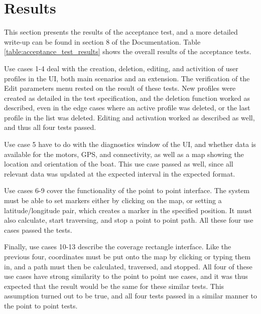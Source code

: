 \newpage
\chapter{Results}
This section presents the results of the acceptance test, and a more detailed write-up can be found in section 8 of the Documentation. Table \ref{table:acceptance_test_results} shows the overall results of the acceptance tests.

Use cases 1-4 deal with the creation, deletion, editing, and activition of user profiles in the UI, both main scenarios and an extension. The verification of the Edit parameters menu rested on the result of these tests. New profiles were created as detailed in the test specification, and the deletion function worked as described, even in the edge cases where an active profile was deleted, or the last profile in the list was deleted. Editing and activation worked as described as well, and thus all four tests passed. 

Use case 5 have to do with the diagnostics window of the UI, and whether data is available for the motors, GPS, and connectivity, as well as a map showing the location and orientation of the boat. This use case passed as well, since all relevant data was updated at the expected interval in the expected format.

Use cases 6-9 cover the functionality of the point to point interface. The system must be able to set markers either by clicking on the map, or setting a latitude/longitude pair, which creates a marker in the specified position. It must also calculate, start traversing, and stop a point to point path. All these four use cases passed the tests.

Finally, use cases 10-13 describe the coverage rectangle interface. Like the previous four, coordinates must be put onto the map by clicking or typing them in, and a path must then be calculated, traversed, and stopped. All four of these use cases have strong similarity to the point to point use cases, and it was thus expected that the result would be the same for these similar tests. This assumption turned out to be true, and all four tests passed in a similar manner to the point to point tests.

